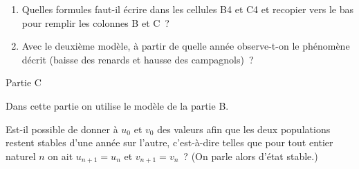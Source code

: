 \medskip
\begin{enumerate}
     \item Quelles formules faut-il écrire dans les cellules B4 et C4 et recopier vers le bas pour remplir
     les colonnes B et C~?
     \item  Avec le deuxième modèle, à partir de quelle année observe-t-on le phénomène décrit (baisse
     des renards et hausse des campagnols)~?
\end{enumerate}
\bigskip
\begin{center}\begin{h3}Partie C \end{h3}\end{center}
\medskip
Dans cette partie on utilise le modèle de la partie B.
\par
Est-il possible de donner à $u_0$ et $v_0$ des valeurs afin que les deux populations restent stables d'une
année sur l'autre, c'est-à-dire telles que pour tout entier naturel $n$ on ait $u_{n+1} = u_n$ et $v_{n+1} = v_n$~? (On parle alors d'état stable.)
\par
\par
